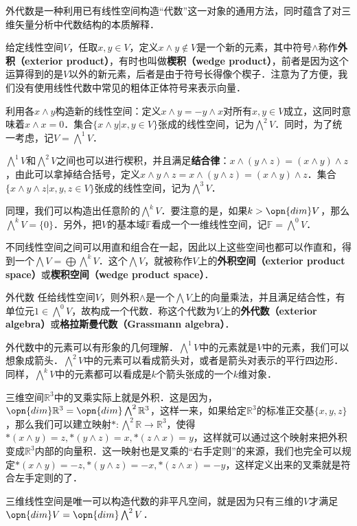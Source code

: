 

外代数是一种利用已有线性空间构造“代数”这一对象的通用方法，同时蕴含了对三维矢量分析中代数结构的本质解释．


给定线性空间$V$，任取$x, y\in V$，定义$x\wedge y\not\in V$是一个新的元素，其中符号$\wedge$称作\textbf{外积（exterior product）}，有时也叫做\textbf{楔积（wedge product）}，前者是因为这个运算得到的是$V$以外的新元素，后者是由于符号长得像个楔子．注意为了方便，我们没有使用线性代数中常见的粗体正体符号来表示向量．

利用各$x\wedge y$构造新的线性空间：定义$x\wedge y=-y\wedge x$对所有$x, y\in V$成立，这同时意味着$x\wedge x=0$．集合$\{x\wedge y|x, y\in V\}$张成的线性空间，记为$\bigwedge^2 V$．同时，为了统一考虑，记$V=\bigwedge^1 V$．

$\bigwedge^1 V$和$\bigwedge^2 V$之间也可以进行楔积，并且满足\textbf{结合律}：$x\wedge(y\wedge z)=(x\wedge y)\wedge z$，由此可以拿掉结合括号，定义$x\wedge y\wedge z=x\wedge(y\wedge z)=(x\wedge y)\wedge z$．集合$\{x\wedge y\wedge z|x, y, z\in V\}$张成的线性空间，记为$\bigwedge^3 V$．

同理，我们可以构造出任意阶的$\bigwedge^k V$．要注意的是，如果$k>\opn{dim} V$，那么$\bigwedge^k V=\{0\}$．另外，把$V$的基本域$\mathbb{F}$看成一个一维线性空间，记$\mathbb{F}=\bigwedge^0 V$．

不同线性空间之间可以用直和组合在一起，因此以上这些空间也都可以作直和，得到一个$\bigwedge V=\bigoplus\bigwedge^k V$．这个$\bigwedge V$，就被称作$V$上的\textbf{外积空间（exterior product space）}或\textbf{楔积空间（wedge product space）}．

\begin{theorem}{外代数}
任给线性空间$V$，则外积$\wedge$是一个$\bigwedge V$上的向量乘法，并且满足结合性，有单位元$1\in \bigwedge^0 V$，故构成一个代数．称这个代数为$V$上的\textbf{外代数（exterior algebra）}或\textbf{格拉斯曼代数（Grassmann algebra）}．
\end{theorem}

外代数中的元素可以有形象的几何理解．$\bigwedge^1 V$中的元素就是$V$中的元素，我们可以想象成箭头．$\bigwedge^2 V$中的元素可以看成箭头对，或者是箭头对表示的平行四边形．同样，$\bigwedge^k V$中的元素都可以看成是$k$个箭头张成的一个$k$维对象．

三维空间$\mathbb{R}^3$中的叉乘实际上就是外积．这是因为，$\opn{dim}\mathbb{R}^3=\opn{dim}\bigwedge^2\mathbb{R}^3$，这样一来，如果给定$\mathbb{R}^3$的标准正交基$\{x, y, z\}$，那么我们可以建立映射$*: \bigwedge^2\mathbb{R}\rightarrow\mathbb{R}^3$，使得$*(x\wedge y)=z, *(y\wedge z)=x, *(z\wedge x)=y$，这样就可以通过这个映射来把外积变成$\mathbb{R}^3$内部的向量积．这一映射也是叉乘的“右手定则”的来源，我们也完全可以规定$*(x\wedge y)=-z, *(y\wedge z)=-x, *(z\wedge x)=-y$，这样定义出来的叉乘就是符合左手定则的了．

三维线性空间是唯一可以构造代数的非平凡空间，就是因为只有三维的$V$才满足$\opn{dim}V=\opn{dim}\bigwedge^2V$．
